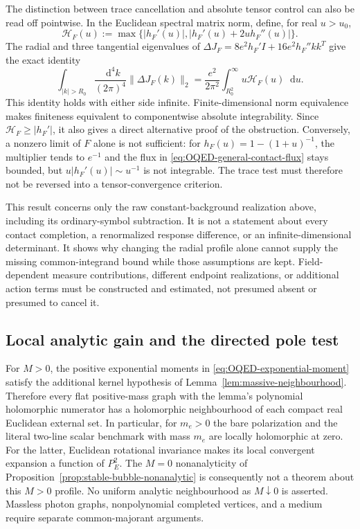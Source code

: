 \documentclass[final,5p,times,twocolumn,numbers,nopreprintline]{elsarticle}
\numberwithin{equation}{section}
\theoremstyle{definition}
\theoremstyle{remark}
\newcommand{\dd}{\mathop{}\!\mathrm d}
\begin{document}
The distinction between trace cancellation and absolute tensor control
can also be read off pointwise. In the Euclidean spectral matrix norm,
define, for real \(u>u_0\),
\[
 \mathcal H_F(u):=\max\{|h_F'(u)|,
                         |h_F'(u)+2u h_F''(u)|\}.
\]
The radial and three tangential eigenvalues of
\(\Delta J_F=8e^2h_F'I+16e^2h_F''kk^T\) give the exact identity
\begin{equation}
 \int_{|k|>R_0}\frac{\dd^4k}{(2\pi)^4}
            \|\Delta J_F(k)\|_2
   =\frac{e^2}{2\pi^2}\int_{R_0^2}^\infty u\mathcal H_F(u)\dd u.
 \label{eq:OQED-contact-norm-test}
\end{equation}
This identity holds with either side infinite. Finite-dimensional norm
equivalence makes finiteness equivalent to componentwise absolute
integrability. Since \(\mathcal H_F\geq|h_F'|\), it also gives a
direct alternative proof of the obstruction. Conversely, a nonzero
limit of \(F\) alone is not sufficient: for
\(h_F(u)=1-(1+u)^{-1}\), the multiplier tends to \(e^{-1}\)
and the flux in \eqref{eq:OQED-general-contact-flux} stays bounded,
but \(u|h_F'(u)|\sim u^{-1}\) is not integrable. The trace test
must therefore not be reversed into a tensor-convergence criterion.

This result concerns only the raw constant-background realization above,
including its ordinary-symbol subtraction. It is not a statement about
every contact completion, a renormalized response difference, or an
infinite-dimensional determinant. It shows why changing the radial
profile alone cannot supply the missing common-integrand bound while
those assumptions are kept. Field-dependent measure contributions,
different endpoint realizations, or additional action terms must be
constructed and estimated, not presumed absent or presumed to cancel it.

\subsection{Local analytic gain and the directed pole test}
\label{sec:OQED-analytic}

For \(M>0\), the positive exponential moments in
\eqref{eq:OQED-exponential-moment} satisfy the additional kernel
hypothesis of Lemma~\ref{lem:massive-neighbourhood}. Therefore every
flat positive-mass graph with the lemma's polynomial holomorphic
numerator has a holomorphic neighbourhood of each compact real
Euclidean external set. In particular, for \(m_e>0\) the bare
polarization and the literal two-line scalar benchmark with mass \(m_e\)
are locally holomorphic at zero. For the latter, Euclidean rotational
invariance makes its local convergent expansion a function of \(P_E^2\).
The \(M=0\) nonanalyticity of Proposition~\ref{prop:stable-bubble-nonanalytic}
is consequently not a theorem about this \(M>0\) profile. No uniform
analytic neighbourhood as \(M\downarrow0\) is asserted. Massless
photon graphs, nonpolynomial completed vertices, and a medium require
separate common-majorant arguments.
\end{document}
